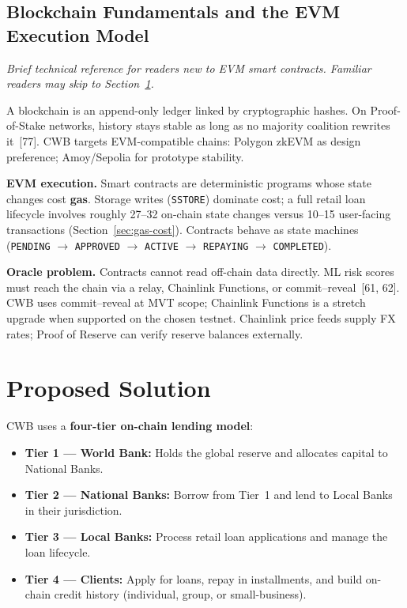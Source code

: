 \documentclass[12pt,a4paper]{report}
\begin{document}
\subsection{Blockchain Fundamentals and the EVM Execution Model}
\label{sec:blockchain-fundamentals}

\noindent\textit{\small Brief technical reference for readers new to EVM smart contracts. Familiar readers may skip to Section~\ref{sec:proposed-solution}.}

A blockchain is an append-only ledger linked by cryptographic hashes. On Proof-of-Stake networks, history stays stable as long as no majority coalition rewrites it~[77]. CWB targets EVM-compatible chains: Polygon zkEVM as design preference; Amoy/Sepolia for prototype stability.

\textbf{EVM execution.} Smart contracts are deterministic programs whose state changes cost \textbf{gas}. Storage writes (\texttt{SSTORE}) dominate cost; a full retail loan lifecycle involves roughly 27--32 on-chain state changes versus 10--15 user-facing transactions (Section~\ref{sec:gas-cost}). Contracts behave as state machines (\texttt{PENDING} $\to$ \texttt{APPROVED} $\to$ \texttt{ACTIVE} $\to$ \texttt{REPAYING} $\to$ \texttt{COMPLETED}).

\textbf{Oracle problem.} Contracts cannot read off-chain data directly. ML risk scores must reach the chain via a relay, Chainlink Functions, or commit--reveal~[61, 62]. CWB uses commit--reveal at MVT scope; Chainlink Functions is a stretch upgrade when supported on the chosen testnet. Chainlink price feeds supply FX rates; Proof of Reserve can verify reserve balances externally.

\section{Proposed Solution}
\label{sec:proposed-solution}

CWB uses a \textbf{four-tier on-chain lending model}:

\begin{itemize}[noitemsep]
\item \textbf{Tier 1 --- World Bank:} Holds the global reserve and allocates capital to National Banks.
\item \textbf{Tier 2 --- National Banks:} Borrow from Tier~1 and lend to Local Banks in their jurisdiction.
\item \textbf{Tier 3 --- Local Banks:} Process retail loan applications and manage the loan lifecycle.
\item \textbf{Tier 4 --- Clients:} Apply for loans, repay in installments, and build on-chain credit history (individual, group, or small-business).
\end{itemize}
\end{document}

